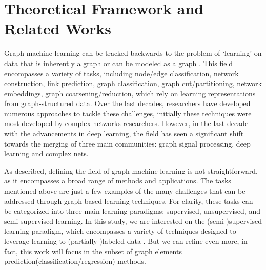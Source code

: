 \chapter[Theoretical Framework]{Theoretical Framework and Related Works}
\label{TheoreticalFramework}

Graph machine learning can be tracked backwards to the problem of
`learning' on data that is inherently a graph \cite{silva2016machine,
  JMLR:Perozzi} or can be modeled as a graph
\cite{verri2013,grape2020}. This field encompasses a variety of tasks,
including node/edge classification, network construction, link
prediction, graph classification, graph cut/partitioning, network
embeddings, graph coarsening/reduction, which rely on learning
representations from graph-structured data. Over the last decades,
researchers have developed numerous approaches to tackle these
challenges, initially these techniques were most developed by complex
networks researchers. However, in the last decade with the
advancements in deep learning, the field has seen a significant shift
towards the merging of three main communities: graph signal
processing, deep learning and complex nets.

As described, defining the field of graph machine learning is not
straightforward, as it encompasses a broad range of methods and
applications. The tasks mentioned above are just a few examples of the
many challenges that can be addressed through graph-based learning
techniques. For clarity, these tasks can be categorized into three
main learning paradigms: supervised, unsupervised, and semi-supervised
learning. In this study, we are interested on the (semi-)supervised
learning paradigm, which encompasses a variety of techniques designed
to leverage learning to (partially-)labeled data
\cite{verri2018advantages,amanciof}. But we can refine even more, in
fact, this work will focus in the subset of graph elements
prediction(classification/regression) methods.

